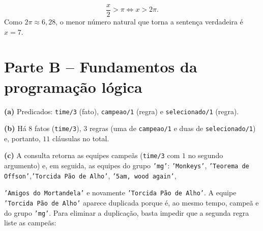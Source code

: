 
\begin{solution}
\[
    \frac{x}{2} > \pi \iff x > 2\pi .
\]
Como $2\pi \approx 6{,}28$, o menor número natural que torna a sentença verdadeira é $x = 7$.
\end{solution}


\section*{Parte B -- Fundamentos da programação lógica}


\begin{solution}
\textbf{(a)} Predicados: \texttt{time/3} (fato), \texttt{campeao/1} (regra) e \texttt{selecionado/1} (regra).

\textbf{(b)} Há $8$ fatos (\texttt{time/3}), $3$ regras (uma de \texttt{campeao/1} e duas de \texttt{selecionado/1}) e, portanto, $11$ cláusulas no total.

\textbf{(c)} A consulta retorna as equipes campeãs (\texttt{time/3} com $1$ no segundo argumento) e, em seguida, as equipes do grupo \texttt{'mg'}: \texttt{'Monkeys'}, \texttt{'Teorema de Offson'},\texttt{'Torcida Pão de Alho'}, \texttt{'5am, wood again'},

\texttt{'Amigos do Mortandela'} e novamente \texttt{'Torcida Pão de Alho'}. A equipe \texttt{'Torcida Pão de Alho'} aparece duplicada porque é, ao mesmo tempo, campeã e do grupo \texttt{'mg'}. Para eliminar a duplicação, basta impedir que a segunda regra liste as campeãs:

\end{solution}

